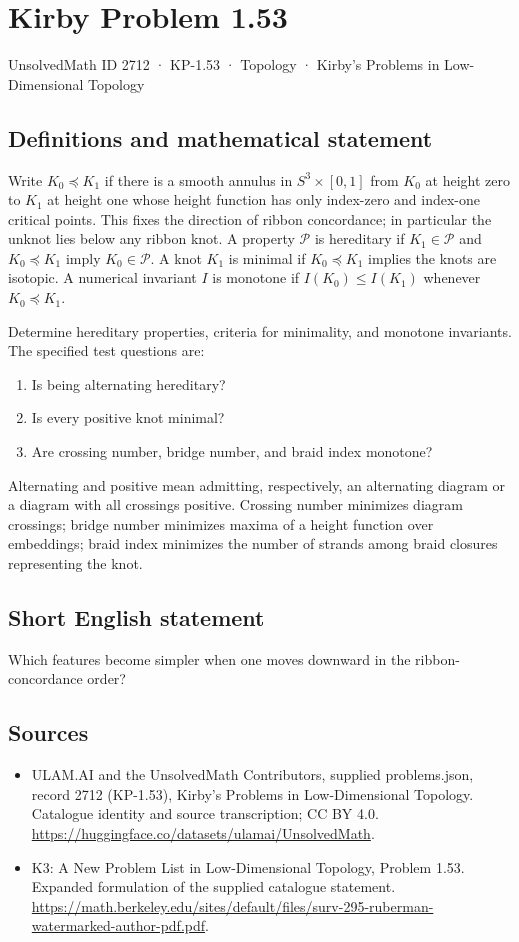 \documentclass[11pt,a4paper]{article}
\begin{document}
\section*{Kirby Problem 1.53}\label{2712}
{\small UnsolvedMath ID 2712 · KP-1.53 · Topology · Kirby's Problems in Low-Dimensional Topology}
\subsection{Definitions and mathematical statement}
Write $K_0\preceq K_1$ if there is a smooth annulus in $S^3\times[0,1]$ from
$K_0$ at height zero to $K_1$ at height one whose height function has only
index-zero and index-one critical points. This fixes the direction of ribbon
concordance; in particular the unknot lies below any ribbon knot.
A property $\mathcal P$ is hereditary if $K_1\in\mathcal P$ and
$K_0\preceq K_1$ imply $K_0\in\mathcal P$. A knot $K_1$ is minimal if
$K_0\preceq K_1$ implies the knots are isotopic. A numerical invariant $I$ is
monotone if $I(K_0)\leq I(K_1)$ whenever $K_0\preceq K_1$.

Determine hereditary properties, criteria for minimality, and monotone
invariants. The specified test questions are:
\begin{enumerate}
\item Is being alternating hereditary?
\item Is every positive knot minimal?
\item Are crossing number, bridge number, and braid index monotone?
\end{enumerate}
Alternating and positive mean admitting, respectively, an alternating diagram
or a diagram with all crossings positive. Crossing number minimizes diagram
crossings; bridge number minimizes maxima of a height function over embeddings;
braid index minimizes the number of strands among braid closures representing
the knot.
\subsection{Short English statement}
Which features become simpler when one moves downward in the ribbon-concordance order?
\subsection{Sources}
\begin{itemize}
\item[S1] ULAM.AI and the UnsolvedMath Contributors, supplied problems.json, record 2712 (KP-1.53), Kirby's Problems in Low-Dimensional Topology. Catalogue identity and source transcription; CC BY 4.0.
\url{https://huggingface.co/datasets/ulamai/UnsolvedMath}.
\item[S2] K3: A New Problem List in Low-Dimensional Topology, Problem 1.53. Expanded formulation of the supplied catalogue statement.
\url{https://math.berkeley.edu/sites/default/files/surv-295-ruberman-watermarked-author-pdf.pdf}.
\end{itemize}
\end{document}
